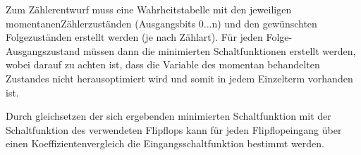 Zum Zählerentwurf muss eine Wahrheitstabelle mit den jeweiligen \glqq
momentanen\grqq Zählerzuständen (Ausgangsbits 0...n) und den gewünschten
Folgezuständen erstellt werden (je nach Zählart). Für jeden
Folge-Ausgangszustand müssen dann die minimierten Schaltfunktionen erstellt
werden, wobei darauf zu achten ist, dass die Variable des momentan behandelten
Zustandes nicht herausoptimiert wird und somit in jedem Einzelterm vorhanden ist.

Durch gleichsetzen der sich ergebenden minimierten Schaltfunktion mit der
Schaltfunktion des verwendeten Flipflops kann für jeden Flipflopeingang über
einen Koeffizientenvergleich die Eingangsschaltfunktion bestimmt werden.